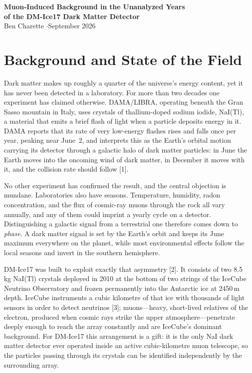 \documentclass[12pt,letterpaper]{article}
\begin{document}
\begin{center}
{\large\bfseries Muon-Induced Background in the Unanalyzed Years}\\[2pt]
{\large\bfseries of the DM-Ice17 Dark Matter Detector}\\[8pt]
{\normalsize Ben Charette \quad$\cdot$\quad September 2026}
\end{center}

\vspace{2pt}
\doublespacing

\section{Background and State of the Field}

Dark matter makes up roughly a quarter of the universe's energy content, yet it has
never been detected in a laboratory. For more than two decades one experiment has
claimed otherwise. DAMA/LIBRA, operating beneath the Gran Sasso mountain in Italy, uses
crystals of thallium-doped sodium iodide, NaI(Tl), a material that emits a brief flash
of light when a particle deposits energy in it. DAMA reports that its rate of very
low-energy flashes rises and falls once per year, peaking near June~2, and interprets
this as the Earth's orbital motion carrying its detector through a galactic halo of
dark matter particles: in June the Earth moves into the oncoming wind of dark matter,
in December it moves with it, and the collision rate should follow [1].

No other experiment has confirmed the result, and the central objection is mundane.
Laboratories also have seasons. Temperature, humidity, radon concentration, and the
flux of cosmic-ray muons through the rock all vary annually, and any of them could
imprint a yearly cycle on a detector. Distinguishing a galactic signal from a
terrestrial one therefore comes down to \emph{phase}. A dark matter signal is set by
the Earth's orbit and keeps its June maximum everywhere on the planet, while most
environmental effects follow the local seasons and invert in the southern hemisphere.

DM-Ice17 was built to exploit exactly that asymmetry [2]. It consists of two 8.5\,kg
NaI(Tl) crystals deployed in 2010 at the bottom of two strings of the IceCube Neutrino
Observatory and frozen permanently into the Antarctic ice at 2450\,m depth. IceCube
instruments a cubic kilometre of that ice with thousands of light sensors in order to
detect neutrinos [3]; muons---heavy, short-lived relatives of the electron, produced
when cosmic rays strike the upper atmosphere---penetrate deeply enough to reach the
array constantly and are IceCube's dominant background. For DM-Ice17 this arrangement
is a gift: it is the only NaI dark matter detector ever operated inside an active
cubic-kilometre muon telescope, so the particles passing through its crystals can be
identified independently by the surrounding array.
\end{document}
